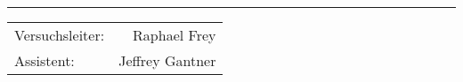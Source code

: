 \begin{titlepage}

    \maketitle

    \vspace{10mm}

    \vspace{12cm}
    \rule{\textwidth}{0.4pt}
    \Huge
    \begin{center}
    \begin{tabular}{lr}

        Versuchsleiter: & Raphael Frey \\
        Assistent: & Jeffrey Gantner \\

    \end{tabular}
    \end{center}
    \normalsize

\end{titlepage}
